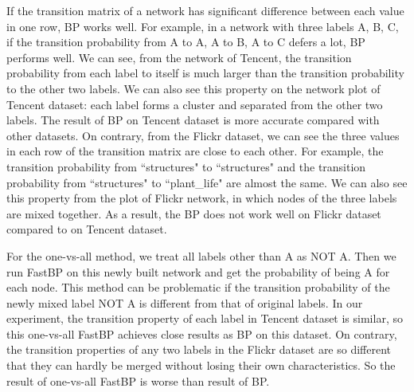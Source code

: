 If the transition matrix of a network has significant difference between each value in one row, BP works well. For example, in a network with three labels A, B, C, if the transition probability from A to A, A to B, A to C defers a lot, BP performs well. We can see, from the network of Tencent, the transition probability from each label to itself is much larger than the transition probability to the other two labels. We can also see this property on the network plot of Tencent dataset: each label forms a cluster and separated from the other two labels. The result of BP on Tencent dataset is more accurate compared with other datasets. On contrary, from the Flickr dataset, we can see the three values in each row of the transition matrix are close to each other. For example, the transition probability from ``structures" to ``structures" and the transition probability from ``structures" to ``plant\_life" are almost the same. We can also see this property from the plot of Flickr network, in which nodes of the three labels are mixed together. As a result, the BP does not work well on Flickr dataset compared to on Tencent dataset. 

For the one-vs-all method, we treat all labels other than A as NOT A. Then we run FastBP on this newly built network and get the probability of being A for each node. This method can be problematic if the transition probability of the newly mixed label NOT A is different from that of original labels. In our experiment, the transition property of each label in Tencent dataset is similar, so this one-vs-all FastBP achieves close results as BP on this dataset. On contrary, the transition properties of any two labels in the Flickr dataset are so different that they can hardly be merged without losing their own characteristics. So the result of one-vs-all FastBP is worse than result of BP.
